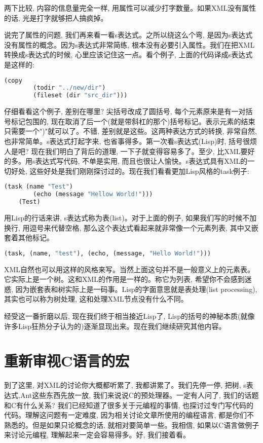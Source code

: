 \documentclass[10pt]{article}
\begin{document}
两下比较, 内容的信息量完全一样, 用属性可以减少打字数量。如果XML没有属性的话, 光是打字就够把人搞疯掉。

说完了属性的问题, 我们再来看一看s表达式。之所以绕这么个弯, 是因为s表达式没有属性的概念。因为s表达式非常简练, 根本没有必要引入属性。我们在把XML转换成s表达式的时候, 心里应该记住这一点。看个例子, 上面的代码译成s表达式是这样的:
\begin{lstlisting}[language=lisp]
    (copy 
        (todir "../new/dir")
        (fileset (dir "src_dir")))
\end{lstlisting}

仔细看看这个例子, 差别在哪里? 尖括号改成了圆括号, 每个元素原来是有一对括号标记包围的, 现在取消了后一个(就是带斜杠的那个)括号标记。表示元素的结束只需要一个")"就可以了。不错, 差别就是这些。这两种表达方式的转换, 非常自然, 也非常简单。s表达式打起字来, 也省事得多。第一次看s表达式(Lisp)时, 括号很烦人是吧? 现在我们明白了背后的道理, 一下子就变得容易多了。至少, 比XML要好的多。用s表达式写代码, 不单是实用, 而且也很让人愉快。s表达式具有XML的一切好处, 这些好处是我们刚刚探讨过的。现在我们看看更加Lisp风格的task例子:
\begin{lstlisting}[language=lisp]
    (task (name "Test")
        (echo (message "Hellow World!")))
    (Test)
\end{lstlisting}

用Lisp的行话来讲, s表达式称为表(list)。对于上面的例子, 如果我们写的时候不加换行, 用逗号来代替空格, 那么这个表达式看起来就非常像一个元素列表, 其中又嵌套着其他标记。
\begin{lstlisting}[language=lisp]
    (task, (name, "test"), (echo, (message, "Hello World!")))
\end{lstlisting}

XML自然也可以用这样的风格来写。当然上面这句并不是一般意义上的元素表。它实际上是一个树。这和XML的作用是一样的。称它为列表, 希望你不会感到迷惑, 因为嵌套表和树实际上是一码事。Lisp的字面意思就是表处理(list processing), 其实也可以称为树处理, 这和处理XML节点没有什么不同。

经受这一番折磨以后, 现在我们终于相当接近Lisp了, Lisp的括号的神秘本质(就像许多Lisp狂热分子认为的)逐渐显现出来。现在我们继续研究其他内容。
\section{重新审视C语言的宏}
\label{sec-6}

到了这里, 对XML的讨论你大概都听累了, 我都讲累了。我们先停一停, 把树, s表达式,Ant这些东西先放一放, 我们来说说C的预处理器。一定有人问了, 我们的话题和C有什么关系? 我们已经知道了很多关于元编程的事情, 也探讨过专门写代码的代码。理解这问题有一定难度, 因为相关讨论文章所使用的编程语言, 都是你们不熟悉的。但是如果只论概念的话, 就相对要简单一些。我相信, 如果以C语言做例子来讨论元编程, 理解起来一定会容易得多。好, 我们接着看。
\end{document}
